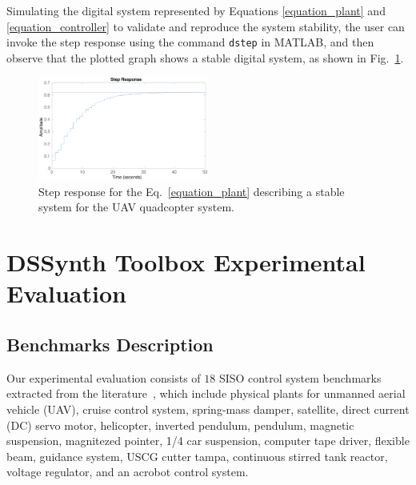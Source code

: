 \documentclass[10pt,conference]{IEEEtran}
\newcommand\tool{{DSSynth Toolbox}\xspace}
\begin{document}
Simulating the digital system represented by Equations \eqref{equation_plant} and \eqref{equation_controller} 
to validate and reproduce the system stability, the user can invoke the step response using the 
command \texttt{dstep} in MATLAB, and then observe that the plotted graph shows a stable digital system, 
as shown in Fig.~\ref{step-response}.
%
\begin{figure}[ht]
  \includegraphics[width=0.5\textwidth]{step-response.eps}
  \caption{Step response for the Eq.~\eqref{equation_plant} describing a stable system for the UAV quadcopter system.}
  \label{step-response}
\end{figure}

\section{\tool Experimental Evaluation}

\subsection{Benchmarks Description}
\label{benchmarks-description}

Our experimental evaluation consists of $18$ SISO control system benchmarks 
extracted from the literature~\cite{abate2017, abatecav2017,bouabdallah, acrobot,cstr,KOKOTOVIC198023,gajic2008optimal,Franklin15, maglev, converters, CTMS},
which include physical plants for unmanned aerial vehicle (UAV), cruise control system, 
spring-mass damper, satellite, direct current (DC) servo motor, helicopter, 
inverted pendulum, pendulum, magnetic suspension, magnitezed pointer, 1/4 car suspension, 
computer tape driver, flexible beam, guidance system, USCG cutter tampa, continuous stirred tank reactor, 
voltage regulator, and an acrobot control system.
\end{document}
